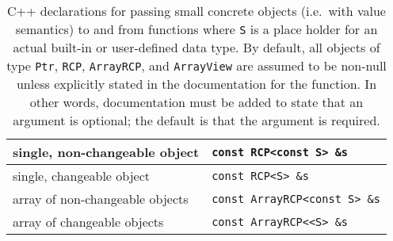 \begin{table}[p]
\begin{center}
\begin{tabular}{|l|l|}
\hline
\hline
single, non-changeable object
& {}\texttt{const RCP<const S> \&s} \\
\hline
single, changeable object
& {}\texttt{const RCP<S> \&s} \\
\hline
array of non-changeable objects
& {}\texttt{const ArrayRCP<const S> \&s} \\
\hline
array of changeable objects
& {}\texttt{const ArrayRCP<<S> \&s} \\
\hline
\end{tabular}
%
%
%
\end{center}
\caption{\label{fig:func_args_value_type}
C++ declarations for passing small concrete objects (i.e.\ with value
semantics) to and from functions where {}\texttt{S} is a place holder for an
actual built-in or user-defined data type.  By default, all objects of type
{}\texttt{Ptr}, {}\texttt{RCP}, {}\texttt{ArrayRCP}, and {}\texttt{ArrayView}
are assumed to be non-null unless explicitly stated in the documentation for
the function.  In other words, documentation must be added to state that an
argument is optional; the default is that the argument is required.}
%
\end{table}


